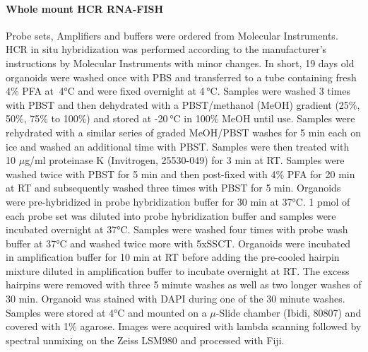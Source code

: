 \paragraph{Whole mount HCR RNA-FISH}
Probe sets, Amplifiers and buffers were ordered from Molecular Instruments. HCR in situ hybridization was performed according to the manufacturer's instructions by Molecular Instruments with minor changes.  In short, 19 days old organoids were washed once with PBS and transferred to a tube containing fresh 4\% PFA at  4°C and were fixed overnight at 4 °C. Samples were washed 3 times with PBST and then dehydrated with a PBST/methanol (MeOH) gradient (25\%, 50\%, 75\% to 100\%) and stored at -20 °C in 100\% MeOH until use. Samples were rehydrated with a similar series of graded MeOH/PBST washes for 5 min each on ice and washed an additional time with PBST. Samples were then treated with 10 $\mu$g/ml proteinase K (Invitrogen, 25530-049)  for 3 min at RT. Samples were washed twice with PBST for 5 min and then post-fixed with 4\% PFA for 20 min at RT and subsequently washed three times with PBST for 5 min. Organoids were pre-hybridized in probe hybridization buffer for 30 min at 37°C. 1 pmol of each probe set was diluted into probe hybridization buffer and samples were incubated overnight at 37°C. Samples were washed four times with probe wash buffer at 37°C and washed twice more with 5xSSCT. Organoids were incubated in amplification buffer for 10 min at RT before adding the pre-cooled hairpin mixture diluted in amplification buffer to incubate overnight at RT. The excess hairpins were removed with three 5 minute washes as well as two longer washes of 30 min. Organoid was stained with DAPI during one of the 30 minute washes. Samples were stored at 4°C and mounted on a $\mu$-Slide chamber (Ibidi, 80807) and covered with 1\% agarose. Images were acquired with lambda scanning followed by spectral unmixing on the Zeiss LSM980 and processed with Fiji.
 
